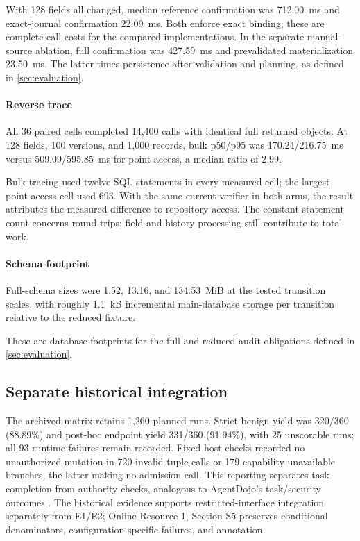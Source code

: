 

With 128 fields all changed, median reference confirmation was 712.00~ms and exact-journal confirmation 22.09~ms. Both enforce exact binding; these are complete-call costs for the compared implementations. In the separate manual-source ablation, full confirmation was 427.59~ms and prevalidated materialization 23.50~ms. The latter times persistence after validation and planning, as defined in \cref{sec:evaluation}.

\paragraph{Reverse trace}
All 36 paired cells completed 14,400 calls with identical full returned objects. At 128 fields, 100 versions, and 1,000 records, bulk p50/p95 was 170.24/216.75~ms versus 509.09/595.85~ms for point access, a median ratio of 2.99.



Bulk tracing used twelve SQL statements in every measured cell; the largest point-access cell used 693. With the same current verifier in both arms, the result attributes the measured difference to repository access. The constant statement count concerns round trips; field and history processing still contribute to total work.

\paragraph{Schema footprint}
Full-schema sizes were 1.52, 13.16, and 134.53~MiB at the tested transition scales, with roughly 1.1~kB incremental main-database storage per transition relative to the reduced fixture.



These are database footprints for the full and reduced audit obligations defined in \cref{sec:evaluation}.

\subsection{Separate historical integration}
\label{sec:historical-integration}

The archived matrix retains 1,260 planned runs. Strict benign yield was 320/360 (88.89\%) and post-hoc endpoint yield 331/360 (91.94\%), with 25 unscorable runs; all 93 runtime failures remain recorded. Fixed host checks recorded no unauthorized mutation in 720 invalid-tuple calls or 179 capability-unavailable branches, the latter making no admission call. This reporting separates task completion from authority checks, analogous to AgentDojo's task/security outcomes \citep{debenedetti2024agentdojo}. The historical evidence supports restricted-interface integration separately from E1/E2; Online Resource 1, Section S5 preserves conditional denominators, configuration-specific failures, and annotation.
